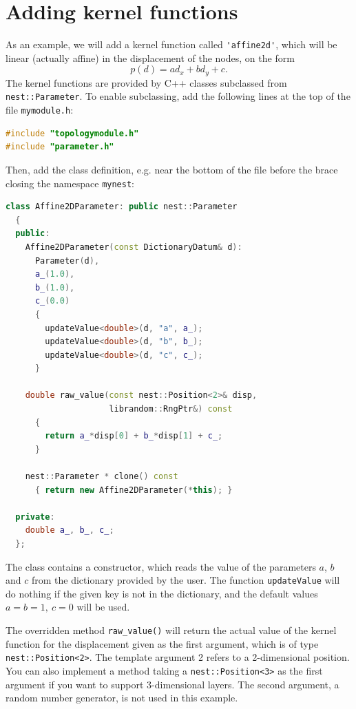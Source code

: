 \documentclass[a4paper,12pt]{report}
\begin{document}
\section{Adding kernel functions}

As an example, we will add a kernel function called \lstinline!'affine2d'!,
which will be linear (actually affine) in the displacement of the nodes, on
the form
\begin{equation*}
  p(d) = a d_x + b d_y + c.
\end{equation*}
The kernel functions are provided by C++ classes subclassed from
\lstinline!nest::Parameter!. To enable subclassing, add the following lines
at the top of the file \lstinline!mymodule.h!:
\begin{lstlisting}[language=C++]
#include "topologymodule.h"
#include "parameter.h"
\end{lstlisting}
Then, add the class definition, e.g. near the bottom of the file before the
brace closing the namespace \lstinline!mynest!:
\begin{lstlisting}[language=C++]
  class Affine2DParameter: public nest::Parameter
  {
  public:
    Affine2DParameter(const DictionaryDatum& d):
      Parameter(d),
      a_(1.0),
      b_(1.0),
      c_(0.0)
      {
        updateValue<double>(d, "a", a_);
        updateValue<double>(d, "b", b_);
        updateValue<double>(d, "c", c_);
      }

    double raw_value(const nest::Position<2>& disp,
                     librandom::RngPtr&) const
      {
        return a_*disp[0] + b_*disp[1] + c_;
      }

    nest::Parameter * clone() const
      { return new Affine2DParameter(*this); }

  private:
    double a_, b_, c_;
  };
\end{lstlisting}
The class contains a constructor, which reads the value of the parameters
$a$, $b$ and $c$ from the dictionary provided by the user. The function
\lstinline!updateValue! will do nothing if the given key is not in the
dictionary, and the default values $a=b=1,\ c=0$ will be used.

The overridden method \lstinline!raw_value()! will return the actual value
of the kernel function for the displacement given as the first argument,
which is of type \lstinline!nest::Position<2>!. The template argument 2
refers to a 2-dimensional position. You can also implement a method taking
a \lstinline!nest::Position<3>! as the first argument if you want to
support 3-dimensional layers. The second argument, a random number
generator, is not used in this example.
\end{document}
